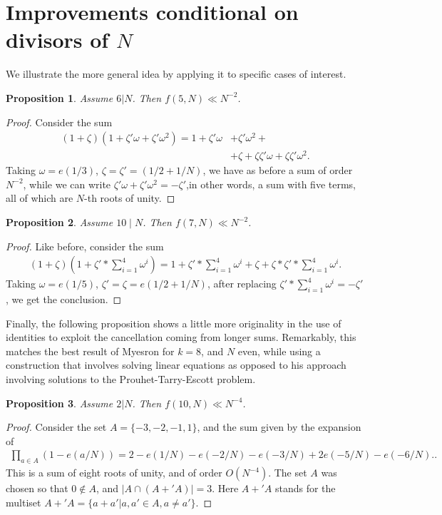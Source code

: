 \documentclass[10pt,a4paper]{amsart}
\newtheorem{proposition}{Proposition}
\begin{document}
\section{Improvements conditional on divisors of $N$}
We illustrate the more general idea by applying it to specific cases of interest.
\begin{proposition}
    Assume $6|N$. Then $f(5,N)\ll N^{-2}$.
\end{proposition}
\begin{proof}
    Consider the sum
    \begin{align*}(1+\zeta)(1+\zeta'\omega+\zeta'\omega^2)=1+\zeta'\omega&+\zeta'\omega^2 +\\&+\zeta+\zeta\zeta'\omega+\zeta\zeta'\omega^2. \end{align*}
    Taking $\omega=e(1/3)$, $\zeta=\zeta'=(1/2+1/N)$, we have as before a sum of order $N^{-2}$, while we can write $\zeta'\omega+\zeta'\omega^2=-\zeta'$,in other words, a sum with five terms, all of which are $N$-th roots of unity.
\end{proof}
\begin{proposition}
    Assume $10\mid N$. Then $f(7,N)\ll N^{-2}$.
\end{proposition}
\begin{proof}
    Like before, consider the sum
    \begin{align*}
        (1+\zeta)(1+\zeta'*\sum_{i=1}^4 \omega^i )=1+\zeta'*\sum_{i=1}^4\omega^i+\zeta+\zeta*\zeta'*\sum_{i=1}^4\omega^i.
    \end{align*}
    Taking $\omega=e(1/5)$, $\zeta'=\zeta=e(1/2+1/N)$, after replacing $\zeta'*\sum_{i=1}^4\omega^i=-\zeta'$, we get the conclusion.
\end{proof}
Finally, the following proposition shows a little more originality in the use of identities to exploit the cancellation coming from longer sums. Remarkably, this matches the best result of Myesron for $k=8$, and $N$ even, while using a construction that involves solving linear equations as opposed to his approach involving solutions to the Prouhet-Tarry-Escott problem.
\begin{proposition}
    Assume $2|N$. Then $f(10,N)\ll N^{-4}$.
\end{proposition}
\begin{proof}
    Consider the set $A=\{ -3,-2,-1,1 \}$, and the sum given by the expansion of
    \begin{align*}
        \prod_{a\in A}(1-e(a/N))=2-e(1/N)-e(-2/N)-e(-3/N)+2e(-5/N)-e(-6/N)..
    \end{align*}
    This is a sum of eight roots of unity, and of order $O(N^{-4})$. The set $A$ was chosen so that $0\notin A$, and $|A \cap (A+'A) |=3$. Here $A+'A$ stands for the multiset $A+'A=\{a+a'|a, a'\in A, a\neq a' \}$. 
\end{proof}
\end{document}
